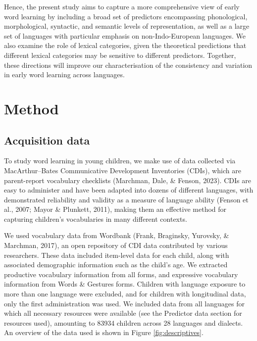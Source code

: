 \documentclass[10pt, letterpaper]{article}
\begin{document}
Hence, the present study aims to capture a more comprehensive view of
early word learning by including a broad set of predictors encompassing
phonological, morphological, syntactic, and semantic levels of
representation, as well as a large set of languages with particular
emphasis on non-Indo-European languages. We also examine the role of
lexical categories, given the theoretical predictions that different
lexical categories may be sensitive to different predictors. Together,
these directions will improve our characterisation of the consistency
and variation in early word learning across languages.

\hypertarget{method}{%
\section{Method}\label{method}}

\hypertarget{acquisition-data}{%
\subsection{Acquisition data}\label{acquisition-data}}

To study word learning in young children, we make use of data collected
via MacArthur--Bates Communicative Development Inventories (CDIs), which
are parent-report vocabulary checklists (Marchman, Dale, \& Fenson,
2023). CDIs are easy to administer and have been adapted into dozens of
different languages, with demonstrated reliability and validity as a
measure of language ability (Fenson et al., 2007; Mayor \& Plunkett,
2011), making them an effective method for capturing children's
vocabularies in many different contexts.

We used vocabulary data from Wordbank (Frank, Braginsky, Yurovsky, \&
Marchman, 2017), an open repository of CDI data contributed by various
researchers. These data included item-level data for each child, along
with associated demographic information such as the child's age. We
extracted productive vocabulary information from all forms, and
expressive vocabulary information from Words \& Gestures forms. Children
with language exposure to more than one language were excluded, and for
children with longitudinal data, only the first administration was used.
We included data from all languages for which all necessary resources
were available (see the Predictor data section for resources used),
amounting to 83934 children across 28 languages and dialects. An
overview of the data used is shown in Figure \ref{fig:descriptives}.
\end{document}
